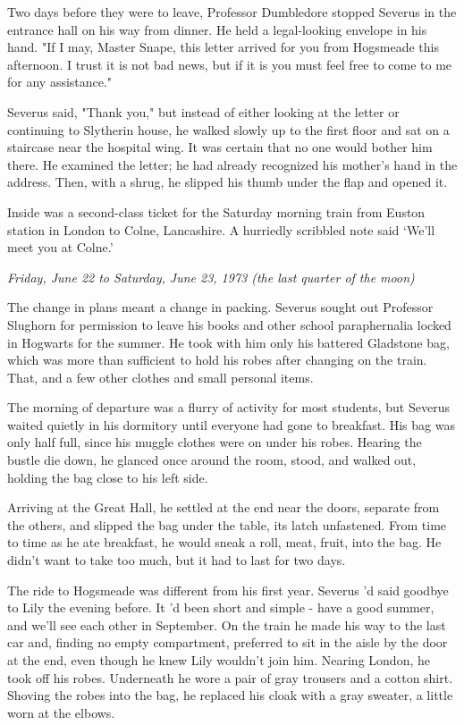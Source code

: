 \documentclass[a4paper,11pt]{article}
\begin{document}
Two days before they were to leave, Professor Dumbledore stopped Severus in the entrance hall on his way from dinner. He held a legal-looking envelope in his hand. "If I may, Master Snape, this letter arrived for you from Hogsmeade this afternoon. I trust it is not bad news, but if it is you must feel free to come to me for any assistance."

Severus said, "Thank you," but instead of either looking at the letter or continuing to Slytherin house, he walked slowly up to the first floor and sat on a staircase near the hospital wing. It was certain that no one would bother him there. He examined the letter; he had already recognized his mother's hand in the address. Then, with a shrug, he slipped his thumb under the flap and opened it.

Inside was a second-class ticket for the Saturday morning train from Euston station in London to Colne, Lancashire. A hurriedly scribbled note said `We'll meet you at Colne.'

\emph{Friday, June 22 to Saturday, June 23, 1973 (the last quarter of the moon)}

The change in plans meant a change in packing. Severus sought out Professor Slughorn for permission to leave his books and other school paraphernalia locked in Hogwarts for the summer. He took with him only his battered Gladstone bag, which was more than sufficient to hold his robes after changing on the train. That, and a few other clothes and small personal items.

The morning of departure was a flurry of activity for most students, but Severus waited quietly in his dormitory until everyone had gone to breakfast. His bag was only half full, since his muggle clothes were on under his robes. Hearing the bustle die down, he glanced once around the room, stood, and walked out, holding the bag close to his left side.

Arriving at the Great Hall, he settled at the end near the doors, separate from the others, and slipped the bag under the table, its latch unfastened. From time to time as he ate breakfast, he would sneak a roll, meat, fruit, into the bag. He didn't want to take too much, but it had to last for two days.

The ride to Hogsmeade was different from his first year. Severus 'd said goodbye to Lily the evening before. It 'd been short and simple - have a good summer, and we'll see each other in September. On the train he made his way to the last car and, finding no empty compartment, preferred to sit in the aisle by the door at the end, even though he knew Lily wouldn't join him. Nearing London, he took off his robes. Underneath he wore a pair of gray trousers and a cotton shirt. Shoving the robes into the bag, he replaced his cloak with a gray sweater, a little worn at the elbows.
\end{document}
